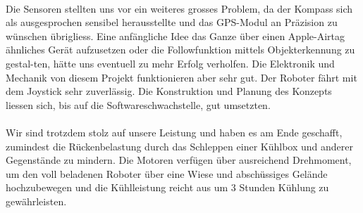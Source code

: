 \\
Die Sensoren stellten uns vor ein weiteres grosses Problem, da der Kompass sich als ausgesprochen sensibel herausstellte und das GPS-Modul an Präzision zu wünschen übrigliess. Eine anfängliche Idee das Ganze über einen Apple-Airtag ähnliches Gerät aufzusetzen oder die Followfunktion mittels Objekterkennung zu gestal-ten, hätte uns eventuell zu mehr Erfolg verholfen.  Die Elektronik und Mechanik von diesem Projekt funktionieren aber sehr gut. Der Roboter fährt mit dem Joystick sehr zuverlässig. Die Konstruktion und Planung des Konzepts liessen sich, bis auf die Softwareschwachstelle, gut umsetzten.\\
\\
Wir sind trotzdem stolz auf unsere Leistung und haben es am Ende geschafft, zumindest die Rückenbelastung durch das Schleppen einer Kühlbox und anderer Gegenstände zu mindern. Die Motoren verfügen über ausreichend Drehmoment, um den voll beladenen Roboter über eine Wiese und abschüssiges Gelände hochzubewegen und die Kühlleistung reicht aus um 3 Stunden Kühlung zu gewährleisten.
